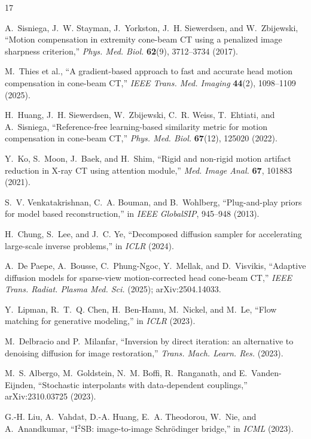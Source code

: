 \documentclass[11pt]{article}
\begin{document}
\begin{thebibliography}{17}\small

 A.~Sisniega, J.~W. Stayman, J.~Yorkston, J.~H. Siewerdsen, and
W.~Zbijewski, ``Motion compensation in extremity cone-beam CT using a penalized image
sharpness criterion,'' \emph{Phys. Med. Biol.} \textbf{62}(9), 3712--3734 (2017).

 M.~Thies et al., ``A gradient-based approach to fast and accurate head
motion compensation in cone-beam CT,'' \emph{IEEE Trans. Med. Imaging} \textbf{44}(2),
1098--1109 (2025).

 H.~Huang, J.~H. Siewerdsen, W.~Zbijewski, C.~R. Weiss, T.~Ehtiati, and
A.~Sisniega, ``Reference-free learning-based similarity metric for motion compensation in
cone-beam CT,'' \emph{Phys. Med. Biol.} \textbf{67}(12), 125020 (2022).

 Y.~Ko, S.~Moon, J.~Baek, and H.~Shim, ``Rigid and non-rigid motion artifact
reduction in X-ray CT using attention module,'' \emph{Med. Image Anal.} \textbf{67}, 101883
(2021).

 S.~V. Venkatakrishnan, C.~A. Bouman, and B.~Wohlberg, ``Plug-and-play priors
for model based reconstruction,'' in \emph{IEEE GlobalSIP}, 945--948 (2013).

 H.~Chung, S.~Lee, and J.~C. Ye, ``Decomposed diffusion sampler for
accelerating large-scale inverse problems,'' in \emph{ICLR} (2024).

 A.~De Paepe, A.~Bousse, C.~Phung-Ngoc, Y.~Mellak, and D.~Visvikis,
``Adaptive diffusion models for sparse-view motion-corrected head cone-beam CT,''
\emph{IEEE Trans. Radiat. Plasma Med. Sci.} (2025); arXiv:2504.14033.

 Y.~Lipman, R.~T.~Q. Chen, H.~Ben-Hamu, M.~Nickel, and M.~Le, ``Flow
matching for generative modeling,'' in \emph{ICLR} (2023).

 M.~Delbracio and P.~Milanfar, ``Inversion by direct iteration: an
alternative to denoising diffusion for image restoration,'' \emph{Trans. Mach. Learn. Res.}
(2023).

 M.~S. Albergo, M.~Goldstein, N.~M. Boffi, R.~Ranganath, and
E.~Vanden-Eijnden, ``Stochastic interpolants with data-dependent couplings,'' arXiv:2310.03725
(2023).

 G.-H. Liu, A.~Vahdat, D.-A. Huang, E.~A. Theodorou, W.~Nie, and
A.~Anandkumar, ``I$^2$SB: image-to-image Schr\"odinger bridge,'' in \emph{ICML} (2023).


\end{thebibliography}
\end{document}
